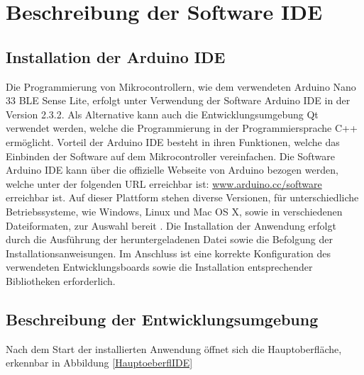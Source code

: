 %
%
%

\chapter{Beschreibung der Software IDE}

\section{Installation der Arduino IDE}

Die Programmierung von Mikrocontrollern, wie dem verwendeten Arduino Nano 33 BLE Sense Lite, erfolgt unter Verwendung der Software Arduino IDE in der Version 2.3.2.  
Als Alternative kann auch die Entwicklungsumgebung Qt verwendet werden, welche die Programmierung in der Programmiersprache C++ ermöglicht. Vorteil der Arduino IDE besteht in ihren Funktionen, welche das Einbinden der Software auf dem Mikrocontroller vereinfachen. Die Software Arduino IDE kann über die offizielle Webseite von Arduino bezogen werden, welche unter der folgenden URL erreichbar ist: \url{www.arduino.cc/software} erreichbar ist. Auf dieser Plattform stehen diverse Versionen, für unterschiedliche Betriebssysteme, wie Windows, Linux und Mac OS X, sowie in verschiedenen Dateiformaten, zur Auswahl bereit \cite{ArdIDE.2024}. Die Installation der Anwendung erfolgt durch die Ausführung der heruntergeladenen Datei sowie die Befolgung der Installationsanweisungen. Im Anschluss ist eine korrekte Konfiguration des verwendeten Entwicklungsboards sowie die Installation entsprechender Bibliotheken erforderlich.

\section{Beschreibung der Entwicklungsumgebung}

Nach dem Start der installierten Anwendung öffnet sich die Hauptoberfläche, erkennbar in Abbildung \ref{HauptoeberflIDE}

